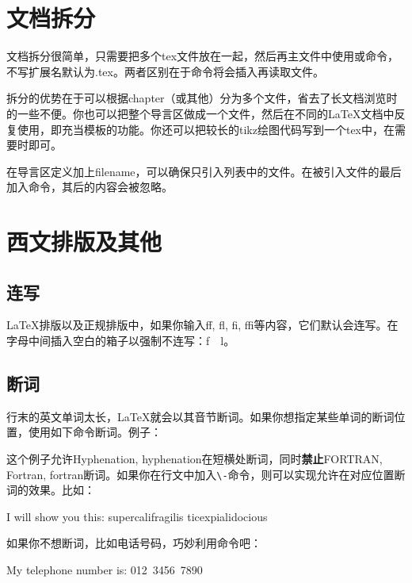 \section{文档拆分}
\label{sec:include}
文档拆分很简单，只需要把多个tex文件放在一起，然后再主文件中使用或命令，不写扩展名默认为.tex。两者区别在于命令将会插入再读取文件。

拆分的优势在于可以根据chapter（或其他）分为多个文件，省去了长文档浏览时的一些不便。你也可以把整个导言区做成一个文件，然后在不同的\LaTeX 文档中反复使用，即充当模板的功能。你还可以把较长的tikz绘图代码写到一个tex中，在需要时即可。

在导言区定义加上filename，可以确保只引入列表中的文件。在被引入文件的最后加入命令，其后的内容会被忽略。

\section{西文排版及其他}
\subsection{连写}
\LaTeX 排版以及正规排版中，如果你输入ff, fl, fi, ffi等内容，它们默认会连写。在字母中间插入空白的箱子以强制不连写：f~~l。

\subsection{断词}
行末的英文单词太长，\LaTeX 就会以其音节断词。如果你想指定某些单词的断词位置，使用如下命令断词。例子：
\begin{latex}
\end{latex}

这个例子允许Hyphenation, hyphenation在短横处断词，同时\textbf{禁止}FORTRAN, Fortran, fortran断词。如果你在行文中加入\verb|\-|命令，则可以实现允许在对应位置断词的效果。比如：

\begin{codeshow}
I will show you this:
su\-per\-cal\-i\-frag\-i\-lis\-%
tic\-ex\-pi\-al\-i\-do\-cious
\end{codeshow}

如果你不想断词，比如电话号码，巧妙利用命令吧：
\begin{latex}
My telephone number is: \mbox{012 3456 7890}
\end{latex}

